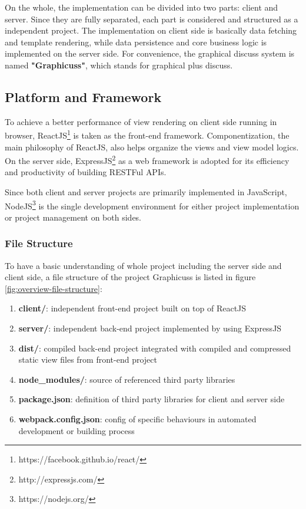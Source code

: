 On the whole, the implementation can be divided into two parts: client and server. Since they are fully separated, each part is considered and structured as a independent project. The implementation on client side is basically data fetching and template rendering, while data persistence and core business logic is implemented on the server side.  For convenience, the graphical discuss system is named \textbf{"Graphicuss"}, which stands for graphical plus discuss.


\subsection{Platform and Framework}
To achieve a better performance of view rendering on client side running in browser, ReactJS\footnote{https://facebook.github.io/react/} is taken as the front-end framework. Componentization, the main philosophy of ReactJS, also helps organize the views and view model logics. On the server side, ExpressJS\footnote{http://expressjs.com/} as a web framework is adopted for its efficiency and productivity of building RESTFul APIs.

Since both client and server projects are primarily implemented in JavaScript, NodeJS\footnote{https://nodejs.org/} is the single development environment for either project implementation or project management on both sides.

\subsubsection{File Structure}

To have a basic understanding of whole project including the server side and client side, a file structure of the project Graphicuss is listed in figure \ref{fig:overview-file-structure}:

\begin{enumerate}
\item 
  \textbf{client/}: independent front-end project built on top of ReactJS
\item
  \textbf{server/}: independent back-end project implemented by using ExpressJS
\item
  \textbf{dist/}: compiled back-end project integrated with compiled and compressed static view files from front-end project
\item 
  \textbf{node\_modules/}: source of referenced third party libraries
\item 
  \textbf{package.json}: definition of third party libraries for client and server side
\item 
  \textbf{webpack.config.json}: config of specific behaviours in automated development or building process
\end{enumerate}


